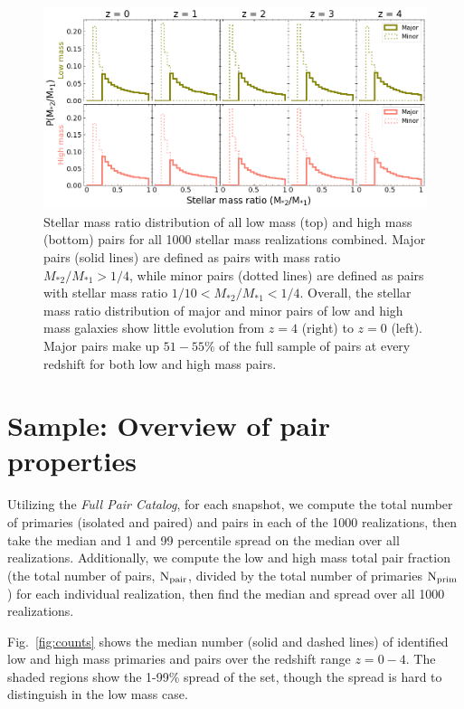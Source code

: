 \documentclass[twocolumn]{aastex631}
\newcommand{\ms}[1]{\ensuremath{M_{*{#1}}}}
\newcommand{\paircat}{\textit{Full Pair Catalog}}
\begin{document}
\begin{figure}[htb]
    \centering
    \includegraphics[width=\textwidth]{smrdist_1000.png}
    \caption{Stellar mass ratio distribution of all low mass (top) and high mass (bottom) pairs for all 1000 stellar mass realizations combined. Major pairs (solid lines) are defined as pairs with mass ratio $\ms{2}/\ms{1} > 1/4$, while minor pairs (dotted lines) are defined as pairs with stellar mass ratio $1/10<\ms{2}/\ms{1}<1/4$. Overall, the stellar mass ratio distribution of major and minor pairs of low and high mass galaxies show little evolution from $z=4$ (right) to $z=0$ (left). 
    Major pairs make up $51-55\%$ of the full sample of pairs at every redshift for both low and high mass pairs.}
    \label{fig:massratio}
\end{figure}

\section{Sample: Overview of pair properties} \label{sec:pairprops}
    Utilizing the \paircat, for each snapshot, we compute the total number of primaries (isolated and paired) and pairs in each of the 1000 realizations, then take the median and 1 and 99 percentile spread on the median over all realizations. 
    Additionally, we compute the low and high mass total pair fraction (the total number of pairs, $\rm N_{pair}$, divided by the total number of primaries $\rm N_{prim}$) for each individual realization, then find the median and spread over all 1000 realizations. 
    
    Fig.~\ref{fig:counts} shows the median number (solid and dashed lines) of identified low and high mass primaries and pairs over the redshift range $z=0-4$.   
    The shaded regions show the 1-99\% spread of the set, though the spread is hard to distinguish in the low mass case.
    
\end{document}
